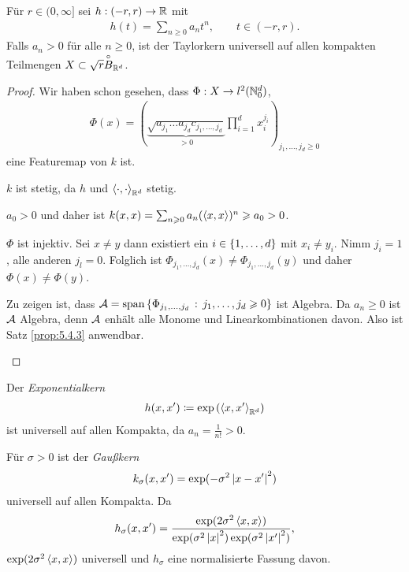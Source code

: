\begin{cor}
\label{prop:5.4.4}
Für $r\in (0,\infty]$ sei $h: (-r,r)\to \R$ mit
\begin{align*}
h(t) = \sum_{n\ge 0} a_n t^n,\qquad t\in (-r,r).
\end{align*}
Falls $a_n >0$ für alle $n\ge 0$, ist der Taylorkern universell auf allen
kompakten Teilmengen $X\subset \sqrt{r}\ocirc{B}_{\R^d}$.\fishhere
\end{cor}
\begin{proof}
Wir haben schon gesehen, dass $\Phi: X\to l^2(\N_0^d)$,
\begin{align*}
\Phi(x) = \left(\underbrace{\sqrt{a_{j_1}\ldots a_{j_d}
c_{j_1,\ldots,j_d}}}_{>0}
\prod\limits_{i=1}^d x_i^{j_i}  \right)_{j_1,\ldots,j_d\ge 0}
\end{align*}
eine Featuremap von $k$ ist.
\begin{proofenum}
\item $k$ ist stetig, da $h$ und $\lin{\cdot,\cdot}_{\R^d}$ stetig.
\item $a_0 > 0$ und daher ist $k(x,x) = \sum_{n\ge 0} a_n(\lin{x,x})^n \ge a_0
> 0$.
\item $\Phi$ ist injektiv. Sei $x\neq y$ dann existiert ein
$i\in\setd{1,\ldots,d}$ mit $x_i\neq y_i$. Nimm $j_i = 1$, alle anderen $j_l =
0$. Folglich ist $\Phi_{j_1,\ldots,j_d}(x) \neq \Phi_{j_1,\ldots,j_d}(y)$ und
daher $\Phi(x)\neq\Phi(y)$.

Zu zeigen ist, dass
$\AA=\mathrm{span}\setdef{\Phi_{j_1,\ldots,j_d}}{j_1,\ldots,j_d \ge 0}$ ist
Algebra. Da $a_n \ge 0$ ist $\AA$ Algebra, denn $\AA$ enhält alle Monome und
Linearkombinationen davon. Also ist Satz \ref{prop:5.4.3} anwendbar.\qedhere
\end{proofenum}
\end{proof}

\begin{bsp*}
Der \textit{Exponentialkern}
\begin{align*}
h(x,x') \defl \exp\left( \lin{x,x'}_{\R^d}\right)
\end{align*}
ist universell auf allen Kompakta, da $a_n = \frac{1}{n!} >0$.\bsphere
\end{bsp*}

\begin{bsp*}
Für $\sigma > 0$ ist der \textit{Gaußkern}
\begin{align*}
k_\sigma(x,x') = \exp(-\sigma^2\abs{x-x'}^2)
\end{align*}
universell auf allen Kompakta. Da
\begin{align*}
h_\sigma(x,x') =
\frac{\exp(2\sigma^2\lin{x,x})}{\exp(\sigma^2\abs{x}^2)\exp(\sigma^2\abs{x'}^2)},
\end{align*}
$\exp(2\sigma^2\lin{x,x})$ universell und $h_\sigma$ eine normalisierte Fassung
davon.\bsphere
\end{bsp*}

